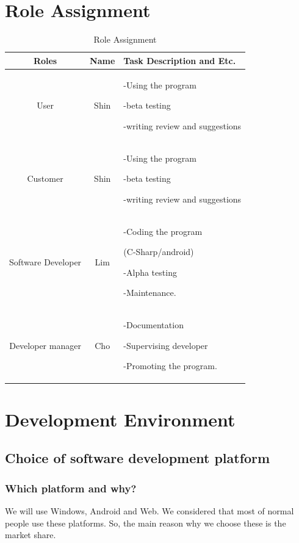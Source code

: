 \documentclass[12pt]{article}
\begin{document}
\section{Role Assignment}
\begin{table}[htb]
\centering
\caption[Role Assignment]{Role Assignment}
\begin{tabular}{|c|c|p{6cm}|}
\hline
\textbf{Roles}& \textbf{Name} & \textbf{Task Description and Etc.}\\ \hline

User & Shin & -Using the program\par
-beta testing\par
-writing review and suggestions
\\ \hline

Customer & Shin & -Using the program\par
-beta testing\par
-writing review and suggestions\\ \hline

Software Developer & Lim & -Coding the program\par(C-Sharp/android)\par
-Alpha testing\par
-Maintenance.
\\ \hline

Developer manager & Cho & -Documentation\par
-Supervising developer\par
-Promoting the program.
\\ \hline

\end{tabular}
\end{table}


\section{Development Environment}
\subsection {Choice of software development platform} 

\subsubsection{Which platform and why?}
We will use Windows, Android and Web. We considered that most of normal people use these platforms. So, the main reason why we choose these is the market share.
\end{document}
